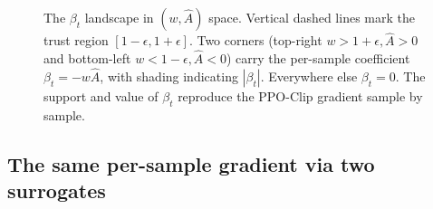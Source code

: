 \documentclass{article}
\begin{document}
\begin{figure}[H]
\caption{The $\beta_t$ landscape in $(w, \hat{A})$ space. Vertical dashed lines mark the trust region $[1-\epsilon, 1+\epsilon]$. Two corners (top-right $w>1+\epsilon,\hat{A}>0$ and bottom-left $w<1-\epsilon,\hat{A}<0$) carry the per-sample coefficient $\beta_t = -w\hat{A}$, with shading indicating $|\beta_t|$. Everywhere else $\beta_t = 0$. The support and value of $\beta_t$ reproduce the PPO-Clip gradient sample by sample.}
\label{fig:app-beta-map}
\end{figure}

\subsection{The same per-sample gradient via two surrogates}
\end{document}
